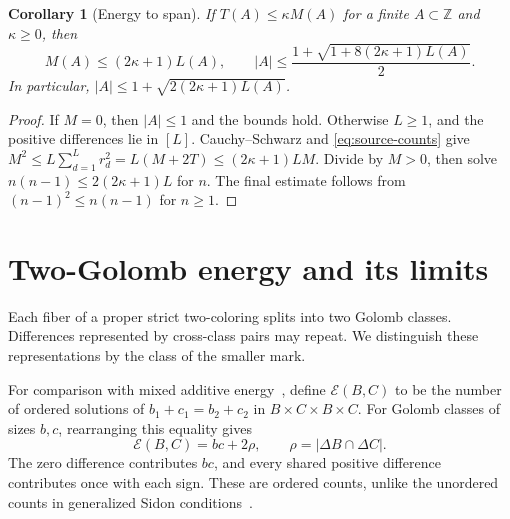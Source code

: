 \documentclass[11pt,a4paper]{article}
\newtheorem{corollary}[theorem]{Corollary}
\theoremstyle{definition}
\newcommand{\Z}{\mathbb Z}
\numberwithin{equation}{section}
\begin{document}
\begin{corollary}[Energy to span]\label{cor:span}
If $T(A)\le\kappa M(A)$ for a finite $A\subset\Z$ and $\kappa\ge0$, then
\begin{equation}\label{eq:energy-to-span}
M(A)\le(2\kappa+1)L(A),\qquad
|A|\le\frac{1+\sqrt{1+8(2\kappa+1)L(A)}}2.
\end{equation}
In particular, $|A|\le1+\sqrt{2(2\kappa+1)L(A)}$.
\end{corollary}
\begin{proof}
If $M=0$, then $|A|\le1$ and the bounds hold.
Otherwise $L\ge1$, and the positive differences lie in $[L]$.
Cauchy--Schwarz and \eqref{eq:source-counts} give
$M^2\le L\sum_{d=1}^Lr_d^2=L(M+2T)\le(2\kappa+1)LM$.
Divide by $M>0$, then solve $n(n-1)\le2(2\kappa+1)L$ for $n$.
The final estimate follows from $(n-1)^2\le n(n-1)$ for $n\ge1$.
\end{proof}

\section{Two-Golomb energy and its limits}\label{sec:energy}
Each fiber of a proper strict two-coloring splits into two Golomb classes.
Differences represented by cross-class pairs may repeat. We distinguish these
representations by the class of the smaller mark.

For comparison with mixed additive energy~\cite[Section~2.1]{Cilleruelo10},
define $\mathcal E(B,C)$ to be the number of ordered solutions of
$b_1+c_1=b_2+c_2$ in $B\times C\times B\times C$.
For Golomb classes of sizes $b,c$, rearranging this equality gives
\begin{equation}\label{eq:mixed-energy-rho}
\mathcal E(B,C)=bc+2\rho,\qquad \rho=|\Delta B\cap\Delta C|.
\end{equation}
The zero difference contributes $bc$, and every shared positive difference
contributes once with each sign. These are ordered counts, unlike the
unordered counts in generalized Sidon conditions~\cite{CRV10}.
\end{document}
